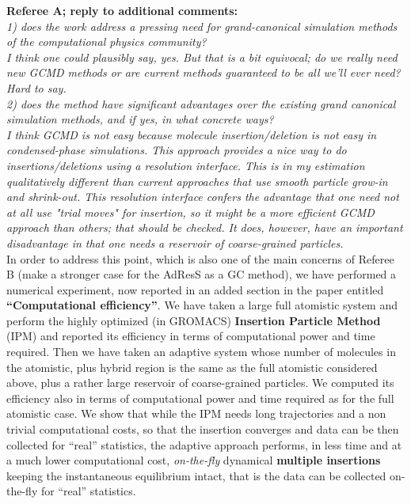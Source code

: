 \documentclass[12pt,a4paper]{article}
\begin{document}
{\bf Referee A; reply to  additional comments:}\\
{\color{teal} {\it 1) does the work address a pressing need for grand-canonical
simulation methods of the computational physics community?\\

I think one could plausibly say, yes. But that is a bit equivocal;
do we really need new GCMD methods or are current methods guaranteed
to be all we'll ever need? Hard to say.\\
2) does the method have significant advantages over the existing
grand canonical simulation methods, and if yes, in what concrete
ways?\\
I think GCMD is not easy because molecule insertion/deletion is not
easy in condensed-phase simulations. This approach provides a nice way
to do insertions/deletions using a resolution interface. This is in
my estimation qualitatively different than current approaches that use
smooth particle grow-in and shrink-out. This resolution interface
confers the advantage that one need not at all use "trial moves" for
insertion, so it might be a more efficient GCMD approach than others;
that should be checked. It does, however, have an important
disadvantage in that one needs a reservoir of coarse-grained
particles.}}\\
In order to address this point, which is also one of the main concerns of Referee B (make a stronger case for the AdResS as a GC method),
we have performed a numerical experiment, now reported in an added section in the paper entitled {\bf ``Computational efficiency''}.
We have taken a large full atomistic system and perform the highly optimized (in GROMACS) {\bf Insertion Particle Method} (IPM)  and reported its efficiency in terms of computational power and time required.
Then we have taken an adaptive system whose number of molecules in the atomistic, plus hybrid region is the same as the full atomistic considered above, plus a rather large reservoir of coarse-grained particles. We computed its efficiency also in terms of computational power and time required as for the full atomistic case.
We show that while the IPM needs long trajectories and a non trivial computational costs, so that the insertion converges and data can be then collected for ``real'' statistics, the adaptive approach performs, in less time and at a much lower computational cost, {\it on-the-fly} dynamical {\bf multiple insertions} keeping the instantaneous equilibrium intact, that is the data can be collected on-the-fly for ``real'' statistics.\\
\end{document}
